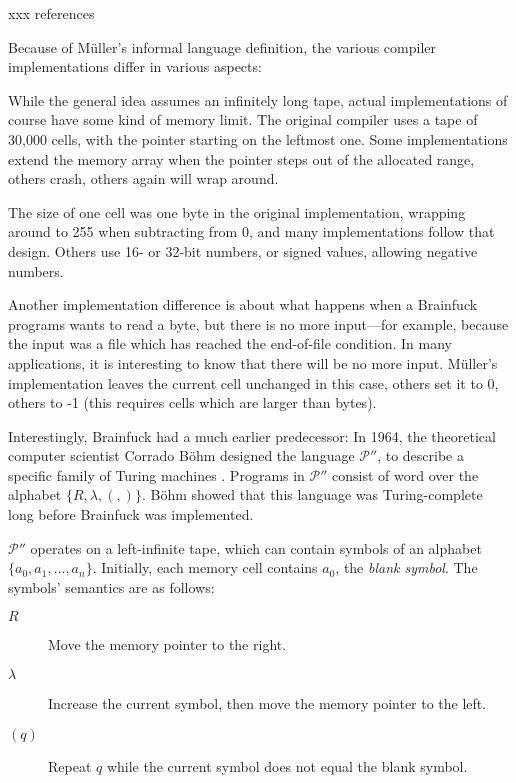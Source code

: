 xxx references

Because of Müller's informal language definition, the various compiler implementations differ in various aspects:

While the general idea assumes an infinitely long tape, actual implementations of course have some kind of memory limit. The original compiler uses a tape of 30,000 cells, with the pointer starting on the leftmost one. Some implementations extend the memory array when the pointer steps out of the allocated range, others crash, others again will wrap around.

The size of one cell was one byte in the original implementation, wrapping around to 255 when subtracting from 0, and many implementations follow that design. Others use 16- or 32-bit numbers, or signed values, allowing negative numbers.

Another implementation difference is about what happens when a Brainfuck programs wants to read a byte, but there is no more input---for example, because the input was a file which has reached the end-of-file condition. In many applications, it is interesting to know that there will be no more input. Müller's implementation leaves the current cell unchanged in this case, others set it to 0, others to -1 (this requires cells which are larger than bytes).

Interestingly, Brainfuck had a much earlier predecessor: In 1964, the theoretical computer scientist Corrado Böhm designed the language $\mathcal{P}''$, to describe a specific family of Turing machines \cite{bohm1964family}. Programs in $\mathcal{P}''$ consist of word over the alphabet $\{R, \lambda, (, )\}$. Böhm showed that this language was Turing-complete long before Brainfuck was implemented.

$\mathcal{P}''$ operates on a left-infinite tape, which can contain symbols of an alphabet $\{a_0, a_1, \dots, a_n\}$. Initially, each memory cell contains $a_0$, the \emph{blank symbol}. The symbols' semantics are as follows:

\begin{description}
    \item[\boldmath$R$] Move the memory pointer to the right.
    \item[\boldmath$\lambda$] Increase the current symbol, then move the memory pointer to the left.
    \item[\boldmath$(q)$] Repeat $q$ while the current symbol does not equal the blank symbol.
\end{description}

